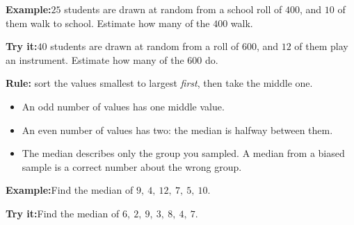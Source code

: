 \documentclass[12pt]{article}
\begin{document}
\begin{examplebox}
\textbf{Example:}\quad $25$ students are drawn at random from a school roll of
$400$, and $10$ of them walk to school. Estimate how many of the $400$ walk.
\end{examplebox}

\begin{tryitbox}
\textbf{Try it:}\quad $40$ students are drawn at random from a roll of $600$,
and $12$ of them play an instrument. Estimate how many of the $600$ do.\\[2pt]
\end{tryitbox}


\begin{formulabox}
\textbf{Rule:} sort the values smallest to largest \emph{first}, then take the
middle one.
\begin{itemize}[leftmargin=0.8cm, itemsep=1pt, topsep=2pt]
  \item An odd number of values has one middle value.
  \item An even number of values has two: the median is halfway between them.
  \item The median describes only the group you sampled. A median from a biased
        sample is a correct number about the wrong group.
\end{itemize}
\end{formulabox}

\begin{examplebox}
\textbf{Example:}\quad Find the median of $9,\ 4,\ 12,\ 7,\ 5,\ 10$.
\end{examplebox}

\begin{tryitbox}
\textbf{Try it:}\quad Find the median of $6,\ 2,\ 9,\ 3,\ 8,\ 4,\ 7$.\\[2pt]
\end{tryitbox}
\end{document}
